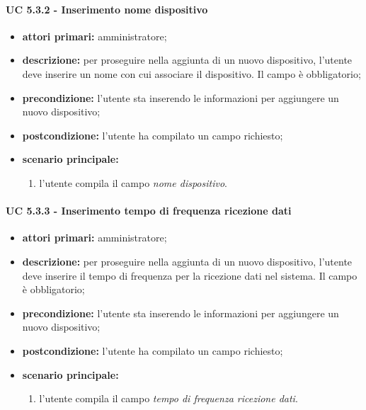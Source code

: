 				\paragraph{UC 5.3.2 - Inserimento nome dispositivo}
				\begin{itemize}
					\item \textbf{attori primari:} amministratore;
					\item \textbf{descrizione:} per proseguire nella aggiunta di un nuovo dispositivo, l'utente deve inserire un nome con cui associare il dispositivo. Il campo è obbligatorio;
					\item \textbf{precondizione:} l'utente sta inserendo le informazioni per aggiungere un nuovo dispositivo;
					\item \textbf{postcondizione:} l'utente ha compilato un campo richiesto;
					\item \textbf{scenario principale:}
					\begin{enumerate}
						\item{l'utente compila il campo \textit{nome dispositivo}.}
					\end{enumerate}
				\end{itemize}

				\paragraph{UC 5.3.3 - Inserimento tempo di frequenza ricezione dati}
				\begin{itemize}
					\item \textbf{attori primari:} amministratore;
					\item \textbf{descrizione:} per proseguire nella aggiunta di un nuovo dispositivo, l'utente deve inserire il tempo di frequenza per la ricezione dati nel sistema. Il campo è obbligatorio;
					\item \textbf{precondizione:} l'utente sta inserendo le informazioni per aggiungere un nuovo dispositivo;
					\item \textbf{postcondizione:} l'utente ha compilato un campo richiesto;
					\item \textbf{scenario principale:}
					\begin{enumerate}
						\item{l'utente compila il campo \textit{tempo di frequenza ricezione dati}.}
					\end{enumerate}
				\end{itemize}

